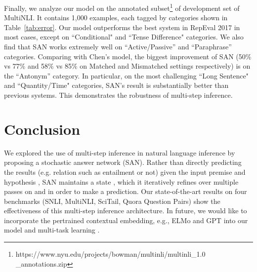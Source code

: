 \documentclass[11pt,a4paper]{article}
\begin{document}
Finally, we analyze our model on the annotated subset\footnote{https://www.nyu.edu/projects/bowman/multinli/multinli\_1.0\\\_annotations.zip} of development set of MultiNLI. It contains 1,000 examples, each tagged by categories shown in Table~\ref{tab:error}. Our model outperforms the best system in RepEval 2017 \cite{2017arXiv171104289C} in most cases, except on ``Conditional" and ``Tense Difference" categories. 
We also find that SAN works extremely well on ``Active/Passive'' and ``Paraphrase'' categories. Comparing with Chen's model, the biggest improvement of SAN (50\% vs 77\% and 58\% vs 85\% on Matched and Mismatched settings respectively) is on the ``Antonym'' category.
In particular, on the most challenging ``Long Sentence" and ``Quantity/Time" categories, SAN's result is substantially better than previous systems. This demonstrates the robustness of multi-step inference. \section{Conclusion}
\label{sec:con}
We explored the use of multi-step inference in natural language inference by proposing a stochastic answer network (SAN).
Rather than directly predicting the results (e.g. relation  such as entailment or not) given the input premise  and hypothesis , SAN maintains a state , which it iteratively refines over multiple passes on  and  in order to make a prediction. 
Our state-of-the-art results on four benchmarks (SNLI, MultiNLI, SciTail, Quora Question Pairs) show the effectiveness of this multi-step inference architecture. In future, we would like to incorporate the pertrained contextual embedding, e.g., ELMo \cite{peters2018deep} and GPT \cite{radford2018improving} into our model and multi-task learning \cite{liu2019mt-dnn}.
 




\end{document}
